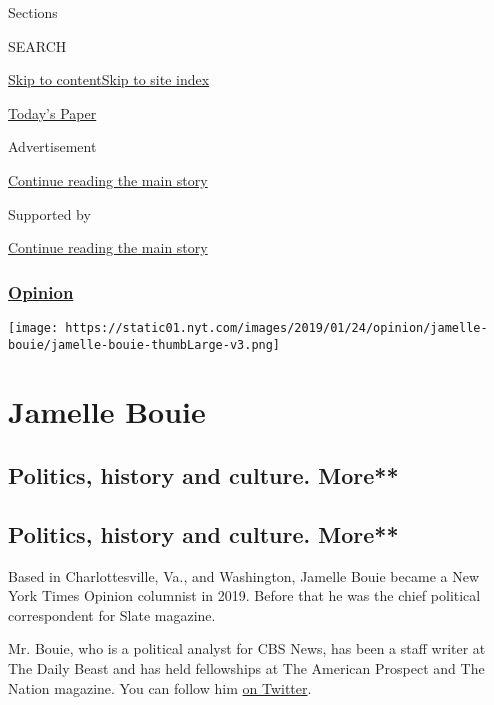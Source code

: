 Sections

SEARCH

\protect\hyperlink{site-content}{Skip to
content}\protect\hyperlink{site-index}{Skip to site index}

\href{https://myaccount.nytimes.com/auth/login?response_type=cookie\&client_id=vi}{}

\href{https://www.nytimes.com/section/todayspaper}{Today's Paper}

Advertisement

\protect\hyperlink{after-top}{Continue reading the main story}

Supported by

\protect\hyperlink{after-sponsor}{Continue reading the main story}

\hypertarget{opinion}{%
\subsubsection{\texorpdfstring{\href{/section/opinion}{Opinion}}{Opinion}}\label{opinion}}

\texttt{[image: https://static01.nyt.com/images/2019/01/24/opinion/jamelle-bouie/jamelle-bouie-thumbLarge-v3.png]}

\hypertarget{jamelle-bouie}{%
\section{Jamelle Bouie}\label{jamelle-bouie}}

\hypertarget{politics-history-and-culture-more}{%
\subsection{Politics, history and culture.
More**}\label{politics-history-and-culture-more}}

\hypertarget{politics-history-and-culture-more-1}{%
\subsection{Politics, history and culture.
More**}\label{politics-history-and-culture-more-1}}

Based in Charlottesville, Va., and Washington, Jamelle Bouie became a
New York Times Opinion columnist in 2019. Before that he was the chief
political correspondent for Slate magazine.

Mr. Bouie, who is a political analyst for CBS News, has been a staff
writer at The Daily Beast and has held fellowships at The American
Prospect and The Nation magazine. You can follow him
\href{https://twitter.com/jbouie}{on Twitter}.

